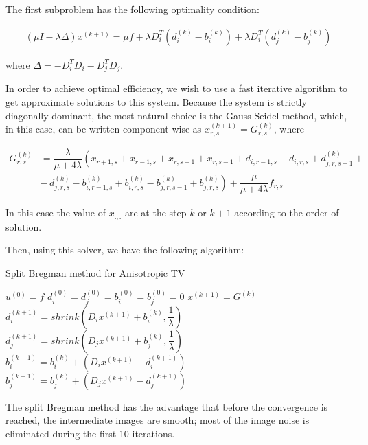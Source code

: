 The first subproblem has the following optimality condition:

\begin{align}
(\mu I - \lambda \Delta) x^{(k+1)} = \mu f + \lambda D_i^T \left(d_i^{(k)}-b_i^{(k)}\right) + \lambda D_i^T \left(d_j^{(k)}-b_j^{(k)}\right)
\end{align}

where $\Delta = - D_i^T D_i - D_j^T D_j$.

In order to achieve optimal efficiency, we wish to use a fast iterative algorithm to get approximate solutions to this system. Because the system is strictly diagonally dominant, the most natural choice is the Gauss-Seidel method, which, in this case, can be written component-wise as $x_{r,s}^{(k+1)} = G_{r,s}^{(k)}$, where

\begin{align*}
G_{r,s}^{(k)} &= \dfrac{\lambda}{\mu + 4 \lambda} \left(x_{r+1,s}+x_{r-1,s}+x_{r,s+1}+x_{r,s-1}+d_{i,r-1,s}-d_{i,r,s} + d_{j,r,s-1}^{(k)}\right.+ \\
&- \left.\,d_{j,r,s}^{(k)} - b_{i,r-1,s}^{(k)} + b_{i,r,s}^{(k)} - b_{j,r,s-1}^{(k)} + b_{j,r,s}^{(k)} \right) + \dfrac{\mu}{\mu + 4 \lambda}f_{r,s}
\end{align*}

In this case the value of $x_{.,.}$ are at the step $k$ or $k+1$ according to the order of solution.

Then, using this solver, we have the following algorithm:

\begin{algorithm}[H]
\caption{Split Bregman method for Anisotropic TV}
\begin{algorithmic}
\STATE $u^{(0)} = f$
\STATE
\STATE $d_i^{(0)} = d_j^{(0)} = b_i^{(0)} = b_j^{(0)}=0$
\STATE
{}
\STATE
\STATE $x^{(k+1)} = G^{(k)}$
\STATE
\STATE $d_i^{(k+1)} = shrink \left(D_i x^{(k+1)} + b_i^{(k)},\dfrac{1}{\lambda}\right)$
\STATE
\STATE $d_j^{(k+1)} = shrink \left(D_j x^{(k+1)} + b_j^{(k)},\dfrac{1}{\lambda}\right)$
\STATE
\STATE $b_i^{(k+1)} = b_i^{(k)} + \left(D_i x^{(k+1)} - d_i^{(k+1)}\right)$
\STATE
\STATE $b_j^{(k+1)} = b_j^{(k)} + \left(D_j x^{(k+1)} - d_j^{(k+1)}\right)$
\ENDWHILE
\end{algorithmic}
\end{algorithm}

The split Bregman method has the advantage that before the convergence is reached, the intermediate images are smooth; most of the image noise is eliminated during the first 10 iterations.

